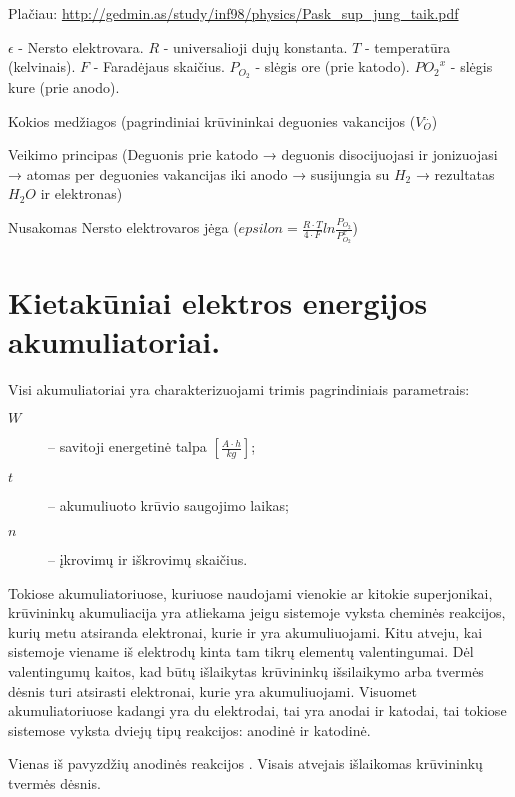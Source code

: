 Plačiau: \url{http://gedmin.as/study/inf98/physics/Pask_sup_jung_taik.pdf}

$\epsilon$ - Nersto elektrovara.
$R$ - universalioji dujų konstanta.
$T$ - temperatūra (kelvinais).
$F$ - Faradėjaus skaičius.
$P_{O_2}$ - slėgis ore (prie katodo).
$P{O_2}^x$ - slėgis kure (prie anodo).

\begin{remember}
  \item Kokios medžiagos (pagrindiniai krūvininkai deguonies vakancijos
  ($V_{O}^{..}$) 
  \item Veikimo principas (Deguonis prie katodo → deguonis
  disocijuojasi ir jonizuojasi →  atomas per deguonies vakancijas
  iki anodo → susijungia su $H_2$ → rezultatas $H_2 O$ ir elektronas)
  \item Nusakomas Nersto elektrovaros jėga
  ($epsilon = \frac{R \cdot T}{4 \cdot F}ln \frac{P_{O_2}}{P_{O_2}^x}$)
\end{remember}

\section{Kietakūniai elektros energijos akumuliatoriai.}

Visi akumuliatoriai yra charakterizuojami trimis pagrindiniais parametrais:
\begin{description}
  \item[$W$]  – savitoji energetinė talpa
    $\left[ \frac{A \cdot h}{kg} \right]$;
  \item[$t$] – akumuliuoto krūvio saugojimo laikas;
  \item[$n$] – įkrovimų ir iškrovimų skaičius.
\end{description}

Tokiose akumuliatoriuose, kuriuose naudojami vienokie ar kitokie
superjonikai, krūvininkų akumuliacija yra atliekama jeigu sistemoje
vyksta cheminės reakcijos, kurių metu atsiranda elektronai, kurie
ir yra akumuliuojami. Kitu atveju, kai sistemoje viename iš
elektrodų kinta tam tikrų elementų valentingumai. Dėl valentingumų
kaitos, kad būtų išlaikytas krūvininkų išsilaikymo arba tvermės
dėsnis turi atsirasti elektronai, kurie yra akumuliuojami.
Visuomet akumuliatoriuose kadangi yra du elektrodai, tai yra anodai
ir katodai, tai tokiose sistemose vyksta dviejų tipų reakcijos:
anodinė ir katodinė.

Vienas iš pavyzdžių anodinės reakcijos .
Visais atvejais išlaikomas krūvininkų tvermės dėsnis.

